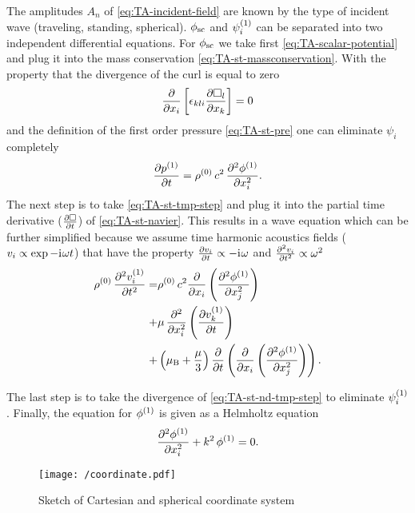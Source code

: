 The amplitudes $A_{n}$ of \cref{eq:TA-incident-field} are known by the type of 
incident wave (traveling, standing, spherical). $\phi_{\mathrm{sc}}$ and 
$\psi_{i}^{(1)}$ can be separated into two independent differential 
equations. For $\phi_{\mathrm{sc}}$ we take first \cref{eq:TA-scalar-potential} 
and plug it into the mass conservation \cref{eq:TA-st-massconservation}. With 
the property that the divergence of the curl is equal to zero
\begin{equation}
  \pdv{x_{i}}\left[\epsilon_{kli}\pdv{\Box_{l}}{x_{k}}\right] = 0
\end{equation}
and the definition of the first order pressure \cref{eq:TA-st-pre} one can 
eliminate $\psi_{i}$ completely
\begin{equation}
  \pdv{  p^{(1)}  }{t} = 
  \rho^{(0)}\,c^{2}\,\pdv[2]{  \phi^{(1)}  }{x_{i}}.
  \label{eq:TA-st-tmp-step}
\end{equation}
The next step is to take \cref{eq:TA-st-tmp-step} and plug it into the partial 
time derivative ($\pdv{\Box}{t}$) of \cref{eq:TA-st-navier}. This results in a 
wave equation which can be further simplified because we assume time harmonic 
acoustics fields ($v_{i}\propto\exp -\mathrm{i}\mkern1mu\omega t$) that have the property 
$\pdv{v_{i}}{t}\propto -\mathrm{i}\mkern1mu\omega$ and
$\pdv[2]{v_{i}}{t}\propto \omega^{2}$
\begin{equation}
  \label{eq:TA-st-nd-tmp-step}
\begin{split}
  \rho^{(0)}\,\pdv[2]{  v_{i}^{(1)}  }{t} = & 
  \rho^{(0)}\,c^{2}\pdv{x_{i}}\left( \pdv[2]{  \phi^{(1)}  }{x_{j}} 
  \right) \\
  + & \mu\,\pdv[2]{x_{i}}\left( \pdv{  v_{k}^{(1)}  }{t} \right) \\
    + & \left(\mu_{\mathrm{B}} + \frac{\mu}{3}\right)\pdv{t}
    \left( \pdv{x_{i}}\left( \pdv[2]{  \phi^{(1)}  }{x_{j}} \right) \right).
\end{split}
\end{equation}

The last step is to take the divergence of \cref{eq:TA-st-nd-tmp-step} to 
eliminate $\psi_{i}^{(1)}$. Finally, the equation for $\phi^{(1)}$ is 
given as a Helmholtz equation
\begin{equation}
  \pdv[2]{  \phi^{(1)}  }{x_{i}} + k^{2}\,\phi^{(1)} = 0.
  \label{eq:TA-st-phi}
\end{equation}

\begin{figure}[tbp]
  \centering
  \texttt{[image: /coordinate.pdf]}
  \caption{Sketch of Cartesian and spherical coordinate system}
  \label{fig:TA-coordinate}
\end{figure}

